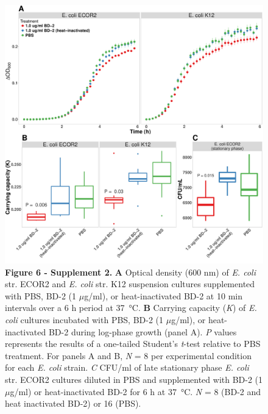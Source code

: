 \documentclass[9pt,lineo]{elife}
\date{\today}
\title{}
\begin{document}
\begin{figure}
  \begin{fullwidth}
\centering\includegraphics[width=0.9\linewidth]{./figures/figure6/figure6_supplement2.pdf}    
 \caption*{\textbf{Figure 6 - Supplement 2. } \textbf{A} Optical density (600 nm) of \textit{E. coli} str. ECOR2 and \textit{E. coli} str. K12 suspension cultures supplemented with PBS, BD-2 (1 $\mu$g/ml), or heat-inactivated BD-2 at 10 min intervals over a 6 h period at \SI{37}{\celsius}. \textbf{B} Carrying capacity (\textit{K}) of \textit{E. coli} cultures incubated  with  PBS, BD-2 (1 $\mu$g/ml), or heat-inactivated BD-2 during log-phase growth (panel A). \textit{P} values represents the results of a one-tailed Student's \textit{t}-test relative to PBS treatment. For panels A and B, \textit{N} = 8 per experimental condition for each \textit{E. coli} strain. \textit{C} CFU/ml of late stationary phase \textit{E. coli} str. ECOR2 cultures diluted in PBS and supplemented with BD-2 (1 $\mu$g/ml) or heat-inactivated BD-2 for 6 h at \SI{37}{\celsius}. \textit{N} = 8 (BD-2 and heat inactivated BD-2) or 16 (PBS).}
\label{fig:fullwidth}
\end{fullwidth}
\end{figure}
\end{document}
